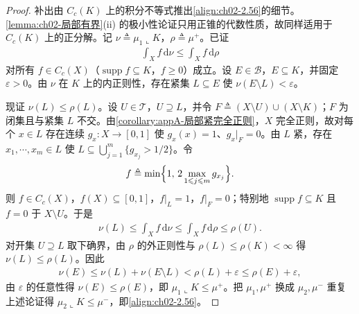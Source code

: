 \documentclass[../../main.tex]{subfiles}%
\begin{document}
\begin{proof}
补出由 $C_c(K)$ 上的积分不等式推出\eqref{align:ch02-2.56}的细节。\cref{lemma:ch02-局部有界}(ii) 的极小性论证只用正锥的代数性质，故同样适用于 $C_c(K)$ 上的正分解。记 $\nu\triangleq\mu_1\llcorner K$，$\rho\triangleq\mu^+$。已证
\begin{align*}
\int_X f\,\mathrm{d}\nu\leqslant\int_X f\,\mathrm{d}\rho
\end{align*}
对所有 $f\in C_c(X)$（$\operatorname{supp}f\subseteq K$，$f\geqslant0$）成立。设 $E\in\mathscr B$，$E\subseteq K$，并固定 $\varepsilon>0$。由 $\nu$ 在 $K$ 上的内正则性，存在紧集 $L\subseteq E$ 使 $\nu(E\setminus L)<\varepsilon$。

现证 $\nu(L)\leqslant\rho(L)$。设 $U\in\mathscr T$，$U\supseteq L$，并令 $F\triangleq(X\setminus U)\cup(X\setminus K)$；$F$ 为闭集且与紧集 $L$ 不交。由\cref{corollary:appA-局部紧完全正则}，$X$ 完全正则，故对每个 $x\in L$ 存在连续 $g_x:X\to[0,1]$ 使 $g_x(x)=1$、$g_x|_F=0$。由 $L$ 紧，存在 $x_1,\cdots ,x_m\in L$ 使 $L\subseteq\bigcup_{j=1}^m\{g_{x_j}>1/2\}$。令
\begin{align*}
f\triangleq\min\Bigl\{1,\,2\max_{1\leqslant j\leqslant m}g_{x_j}\Bigr\}.
\end{align*}
则 $f\in C_c(X)$，$f(X)\subseteq[0,1]$，$f|_L=1$，$f|_F=0$；特别地 $\operatorname{supp}f\subseteq K$ 且 $f=0$ 于 $X\setminus U$。于是
\begin{align*}
\nu(L)\leqslant\int_Xf\,\mathrm{d}\nu\leqslant\int_Xf\,\mathrm{d}\rho\leqslant\rho(U).
\end{align*}
对开集 $U\supseteq L$ 取下确界，由 $\rho$ 的外正则性与 $\rho(L)\leqslant\rho(K)<\infty$ 得 $\nu(L)\leqslant\rho(L)$。因此
\begin{align*}
\nu(E)\leqslant\nu(L)+\nu(E\setminus L)<\rho(L)+\varepsilon\leqslant\rho(E)+\varepsilon,
\end{align*}
由 $\varepsilon$ 的任意性得 $\nu(E)\leqslant\rho(E)$，即 $\mu_1\llcorner K\leqslant\mu^+$。把 $\mu_1,\mu^+$ 换成 $\mu_2,\mu^-$ 重复上述论证得 $\mu_2\llcorner K\leqslant\mu^-$，即\eqref{align:ch02-2.56}。
\end{proof}
\end{document}
